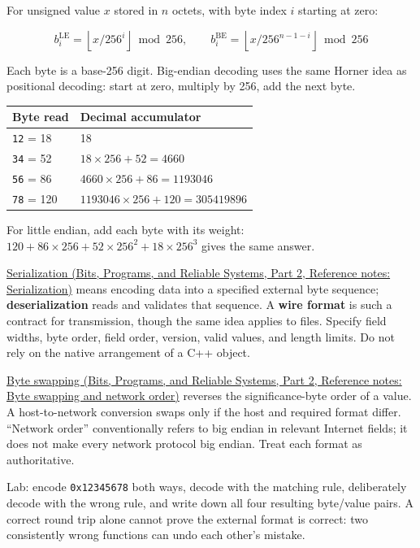 For unsigned value \(x\) stored in \(n\) octets, with byte index \(i\) starting at zero:

\[
b_i^{\mathrm{LE}}=\left\lfloor x/256^i\right\rfloor\bmod256,\qquad
b_i^{\mathrm{BE}}=\left\lfloor x/256^{n-1-i}\right\rfloor\bmod256
\]

Each byte is a base-256 digit. Big-endian decoding uses the same Horner idea as positional decoding: start at zero, multiply by 256, add the next byte.

{\def\LTcaptype{none} %
\begin{longtable}[]{@{}ll@{}}
\toprule\noalign{}
Byte read & Decimal accumulator \\
\midrule\noalign{}
\endhead
\bottomrule\noalign{}
\endlastfoot
\texttt{12} = 18 & 18 \\
\texttt{34} = 52 & \(18\times256+52=4660\) \\
\texttt{56} = 86 & \(4660\times256+86=1193046\) \\
\texttt{78} = 120 & \(1193046\times256+120=305419896\) \\
\end{longtable}
}

For little endian, add each byte with its weight: \(120+86\times256+52\times256^2+18\times256^3\) gives the same answer.

\href{../01-Bits-Programs-and-Reliable-Systems-P02/main.pdf\#nameddest=appendix-91d09ebed979}{Serialization (Bits, Programs, and Reliable Systems, Part 2, Reference notes: Serialization)} means encoding data into a specified external byte sequence; \textbf{deserialization} reads and validates that sequence. A \textbf{wire format} is such a contract for transmission, though the same idea applies to files. Specify field widths, byte order, field order, version, valid values, and length limits. Do not rely on the native arrangement of a C++ object.

\href{../01-Bits-Programs-and-Reliable-Systems-P02/main.pdf\#nameddest=appendix-11ba36693aa2}{Byte swapping (Bits, Programs, and Reliable Systems, Part 2, Reference notes: Byte swapping and network order)} reverses the significance-byte order of a value. A host-to-network conversion swaps only if the host and required format differ. ``Network order'' conventionally refers to big endian in relevant Internet fields; it does not make every network protocol big endian. Treat each format as authoritative.

Lab: encode \texttt{0x12345678} both ways, decode with the matching rule, deliberately decode with the wrong rule, and write down all four resulting byte/value pairs. A correct round trip alone cannot prove the external format is correct: two consistently wrong functions can undo each other's mistake.

